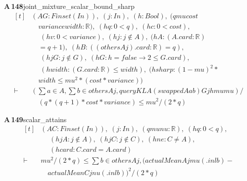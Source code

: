 \documentclass[conference]{IEEEtran}
\theoremstyle{definition}
\newcommand{\lean}[1]{\textsf{\footnotesize #1}}
\begin{document}
\noindent\textbf{A\,148}\quad\lean{joint\_mixture\_scalar\_bound\_sharp}
{\footnotesize\[ \begin{aligned}[t]
&(\mathit{A} \mathit{G} : \mathit{Finset} (\mathit{I} \mathit{n})),\; (\mathit{j} : \mathit{I} \mathit{n}),\; (\mathit{h} : \mathit{Bool}),\; (\mathit{q} \mathit{mu} \mathit{cost}\\
&\quad \mathit{variance} \mathit{width} : \mathbb{R} ),\; (\mathit{hq} : 0<\mathit{q}),\; (\mathit{hc} : 0<\mathit{cost}),\\
&\quad \; (\mathit{hv} : 0<\mathit{variance}),\; (\mathit{hj} : \mathit{j} \notin \mathit{A}),\; (\mathit{hA} : (\mathit{A}.\mathit{card}:\mathbb{R} )\\
&\quad =\mathit{q}+1),\; (\mathit{hB} : ((\mathit{others} \mathit{A} \mathit{j}).\mathit{card}:\mathbb{R} )=\mathit{q}),\\
&\quad \; (\mathit{hjG} : \mathit{j} \notin \mathit{G}),\; (\mathit{hG} : \mathit{h}=\mathit{false} \to 2 \leq \mathit{G}.\mathit{card}),\\
&\quad \; (\mathit{hwidth} : (\mathit{G}.\mathit{card}:\mathbb{R} ) \leq \mathit{width}),\; (\mathit{hsharp} : (1-\mathit{mu})^{2}*\\
&\quad \mathit{width} \leq \mathit{mu}^{2}*(\mathit{cost}*\mathit{variance}))\\
\vdash\;&(\textstyle\sum \mathit{a} \in \mathit{A},\textstyle\sum \mathit{b} \in \mathit{others} \mathit{A} \mathit{j},\mathit{queryKL} \mathit{A} (\mathit{swapped} \mathit{A} \mathit{a} \mathit{b}) \mathit{G} \mathit{j} \mathit{h} \mathit{mu} \mathit{mu})/\\
&\quad (\mathit{q}*(\mathit{q}+1)*\mathit{cost}*\mathit{variance}) \leq \mathit{mu}^{2}/(2*\mathit{q})
\end{aligned} \]}

\noindent\textbf{A\,149}\quad\lean{scalar\_attains}
{\footnotesize\[ \begin{aligned}[t]
&(\mathit{A} \mathit{C} : \mathit{Finset} (\mathit{I} \mathit{n})),\; (\mathit{j} : \mathit{I} \mathit{n}),\; (\mathit{q} \mathit{mu} \mathit{nu} : \mathbb{R} ),\; (\mathit{hq} : 0<\mathit{q}),\\
&\quad \; (\mathit{hjA} : \mathit{j} \notin \mathit{A}),\; (\mathit{hjC} : \mathit{j} \notin \mathit{C}),\; (\mathit{hne} : \mathit{C} \neq \mathit{A}),\\
&\quad \; (\mathit{hcard} : \mathit{C}.\mathit{card}=\mathit{A}.\mathit{card})\\
\vdash\;&\mathit{mu}^{2}/(2*\mathit{q}) \leq \textstyle\sum \mathit{b} \in \mathit{others} \mathit{A} \mathit{j}, (\mathit{actualMean} \mathit{A} \mathit{j} \mathit{mu} (.\mathit{inl} \mathit{b})-\\
&\quad \mathit{actualMean} \mathit{C} \mathit{j} \mathit{nu} (.\mathit{inl} \mathit{b}))^{2}/(2*\mathit{q})
\end{aligned} \]}
\end{document}
